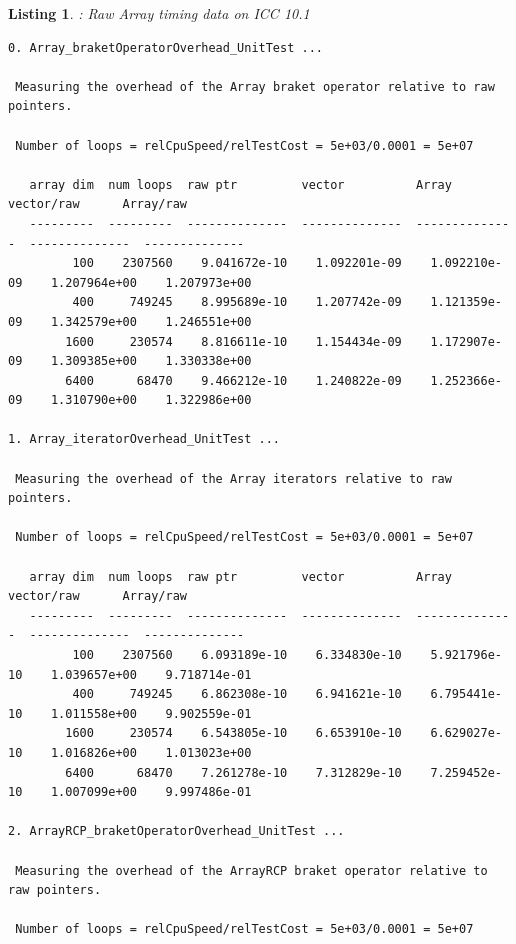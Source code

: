 \documentclass[pdf,ps2pdf,11pt]{SANDreport}
\newtheorem{listing}{Listing}
\begin{document}
\pagebreak

\begin{listing}: Raw Array timing data on ICC 10.1  \\
\label{listing:Array-ICC-Timings}
{\scriptsize\begin{verbatim}
0. Array_braketOperatorOverhead_UnitTest ... 
 
 Measuring the overhead of the Array braket operator relative to raw pointers.
 
 Number of loops = relCpuSpeed/relTestCost = 5e+03/0.0001 = 5e+07
 
   array dim  num loops  raw ptr         vector          Array           vector/raw      Array/raw     
   ---------  ---------  --------------  --------------  --------------  --------------  --------------
         100    2307560    9.041672e-10    1.092201e-09    1.092210e-09    1.207964e+00    1.207973e+00
         400     749245    8.995689e-10    1.207742e-09    1.121359e-09    1.342579e+00    1.246551e+00
        1600     230574    8.816611e-10    1.154434e-09    1.172907e-09    1.309385e+00    1.330338e+00
        6400      68470    9.466212e-10    1.240822e-09    1.252366e-09    1.310790e+00    1.322986e+00

1. Array_iteratorOverhead_UnitTest ... 
 
 Measuring the overhead of the Array iterators relative to raw pointers.
 
 Number of loops = relCpuSpeed/relTestCost = 5e+03/0.0001 = 5e+07
 
   array dim  num loops  raw ptr         vector          Array           vector/raw      Array/raw     
   ---------  ---------  --------------  --------------  --------------  --------------  --------------
         100    2307560    6.093189e-10    6.334830e-10    5.921796e-10    1.039657e+00    9.718714e-01
         400     749245    6.862308e-10    6.941621e-10    6.795441e-10    1.011558e+00    9.902559e-01
        1600     230574    6.543805e-10    6.653910e-10    6.629027e-10    1.016826e+00    1.013023e+00
        6400      68470    7.261278e-10    7.312829e-10    7.259452e-10    1.007099e+00    9.997486e-01

2. ArrayRCP_braketOperatorOverhead_UnitTest ... 
 
 Measuring the overhead of the ArrayRCP braket operator relative to raw pointers.
 
 Number of loops = relCpuSpeed/relTestCost = 5e+03/0.0001 = 5e+07
 

\end{verbatim}}
\end{listing}
\end{document}

